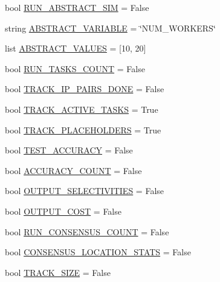 \begin{DoxyCompactItemize}
\item 
bool \mbox{\hyperlink{namespacereorder_a73b7b22a82dc40407d03e22dca8ac257}{R\+U\+N\+\_\+\+A\+B\+S\+T\+R\+A\+C\+T\+\_\+\+S\+IM}} = False
\item 
string \mbox{\hyperlink{namespacereorder_a05ba5c39ee5a05284597d091b01650a3}{A\+B\+S\+T\+R\+A\+C\+T\+\_\+\+V\+A\+R\+I\+A\+B\+LE}} = \char`\"{}N\+U\+M\+\_\+\+W\+O\+R\+K\+E\+RS\char`\"{}
\item 
list \mbox{\hyperlink{namespacereorder_ab64c8432c11e4b89425ac1f220ca01a9}{A\+B\+S\+T\+R\+A\+C\+T\+\_\+\+V\+A\+L\+U\+ES}} = \mbox{[}10, 20\mbox{]}
\item 
bool \mbox{\hyperlink{namespacereorder_a904bebe166c12146cac5f4dec979450c}{R\+U\+N\+\_\+\+T\+A\+S\+K\+S\+\_\+\+C\+O\+U\+NT}} = False
\item 
bool \mbox{\hyperlink{namespacereorder_ac1bb03e2d3e1f9304e6628d802795547}{T\+R\+A\+C\+K\+\_\+\+I\+P\+\_\+\+P\+A\+I\+R\+S\+\_\+\+D\+O\+NE}} = False
\item 
bool \mbox{\hyperlink{namespacereorder_a9c5fce243b39b491bbdf705555a92617}{T\+R\+A\+C\+K\+\_\+\+A\+C\+T\+I\+V\+E\+\_\+\+T\+A\+S\+KS}} = True
\item 
bool \mbox{\hyperlink{namespacereorder_a2be074e9eca6d662578ca68c95050ad3}{T\+R\+A\+C\+K\+\_\+\+P\+L\+A\+C\+E\+H\+O\+L\+D\+E\+RS}} = True
\item 
bool \mbox{\hyperlink{namespacereorder_a899bd5bdb20b1d0a0592390572cc4e87}{T\+E\+S\+T\+\_\+\+A\+C\+C\+U\+R\+A\+CY}} = False
\item 
bool \mbox{\hyperlink{namespacereorder_ae898ca1b1c4681151406ecc2921a738b}{A\+C\+C\+U\+R\+A\+C\+Y\+\_\+\+C\+O\+U\+NT}} = False
\item 
bool \mbox{\hyperlink{namespacereorder_ac8f124f313b63d29e1664ff5fc7a049f}{O\+U\+T\+P\+U\+T\+\_\+\+S\+E\+L\+E\+C\+T\+I\+V\+I\+T\+I\+ES}} = False
\item 
bool \mbox{\hyperlink{namespacereorder_a2c3c37ecd0a669270751ba1fcdc0439f}{O\+U\+T\+P\+U\+T\+\_\+\+C\+O\+ST}} = False
\item 
bool \mbox{\hyperlink{namespacereorder_ab852b5e6373777202ed3eabdf511f026}{R\+U\+N\+\_\+\+C\+O\+N\+S\+E\+N\+S\+U\+S\+\_\+\+C\+O\+U\+NT}} = False
\item 
bool \mbox{\hyperlink{namespacereorder_ad7f3dbdec359eb538bf1890793d541ad}{C\+O\+N\+S\+E\+N\+S\+U\+S\+\_\+\+L\+O\+C\+A\+T\+I\+O\+N\+\_\+\+S\+T\+A\+TS}} = False
\item 
bool \mbox{\hyperlink{namespacereorder_a2051e4cd9bae895351ea7a73696fd815}{T\+R\+A\+C\+K\+\_\+\+S\+I\+ZE}} = False

\end{DoxyCompactItemize}

